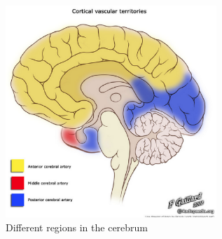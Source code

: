 \begin{figure}[hbt]
  \centerline{\includegraphics[height=8cm,
    angle=0]{./images/cerebral_arteries.eps}}
\caption{Different regions in the cerebrum}
\label{fig:cerebral_arteries}
\end{figure}

